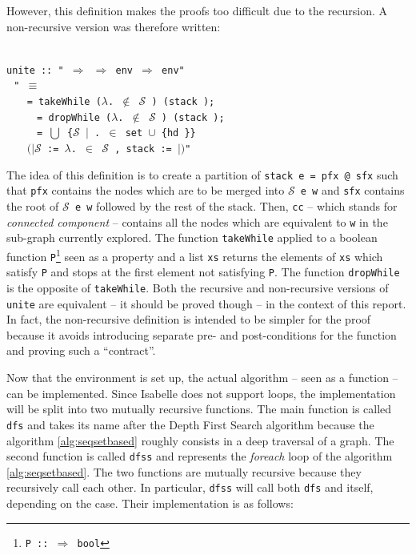 \documentclass[a4 paper, 12pt]{article}
\newcommand{\where}{{\color{isa_green}{where}}}
\newcommand{\generic}[1]{{\color{isa_purple}{\textquotesingle#1}}}
\newcommand{\isa}[1]{\small\texttt{\\\noindent#1}}
\newcommand{\blue}[1]{{\color{isa_dark_blue}{#1}}}
\newcommand{\bblue}[1]{{\color{isa_blue}{#1}}}
\newcommand{\green}[1]{{\color{isa_dark_green}{#1}}}
\newcommand{\env}[1]{$(\!|$#1$|\!)$}
\theoremstyle{definition}
\begin{document}
\BlankLine

However, this definition makes the proofs too difficult due to the recursion. A non-recursive version was therefore written:

\isa{
    \bblue{definition} unite :: "\generic{v} $\Rightarrow$ \generic{v} $\Rightarrow$ \generic{v} env $\Rightarrow$ \generic{v} env" \where{}\\
    $~~~$"\blue{unite} \green{v w e} $\equiv$\\
    $~~~~~~$\bblue{let} \green{pfx} = takeWhile ($\lambda$\green{x}. \green{w} $\notin$ $\mathcal{S}$ \green{e x}) (stack \green{e});\\
    $~~~~~~~~~~$\green{sfx} = dropWhile ($\lambda$\green{x}. \green{w} $\notin$ $\mathcal{S}$ \green{e x}) (stack \green{e});\\
    $~~~~~~~~~~$\green{cc} = $\bigcup$ \{$\mathcal{S}$ \green{e x} $|$ \green{x}. \green{x} $\in$ set \green{pfx} $\cup$ \{hd \green{sfx}\}\}\\
    $~~~~~~$\bblue{in}  \green{e}\env{$\mathcal{S}$ := $\lambda$\green{x}. \bblue{if} \green{x} $\in$ \green{cc} \bblue{then} \green{cc} \bblue{else} $\mathcal{S}$ \green{e x}, stack := \green{sfx}}"
}
    
\BlankLine
\BlankLine
\BlankLine

The idea of this definition is to create a partition of \texttt{stack e = pfx @ sfx} such that \texttt{pfx} contains the nodes which are to be merged into \texttt{$\mathcal{S}$ e w} and \texttt{sfx} contains the root of \texttt{$\mathcal{S}$ e w} followed by the rest of the stack. Then, \texttt{cc} -- which stands for \textit{connected component} -- contains all the nodes which are equivalent to \texttt{w} in the sub-graph currently explored. The function \texttt{takeWhile} applied to a boolean function \texttt{P}\footnote{\texttt{P :: \generic{a} $\Rightarrow$ bool}} seen as a property and a list \texttt{xs} returns the elements of \texttt{xs} which satisfy \texttt{P} and stops at the first element not satisfying \texttt{P}. The function \texttt{dropWhile} is the opposite of \texttt{takeWhile}. Both the recursive and non-recursive versions of \texttt{unite} are equivalent -- it should be proved though -- in the context of this report. In fact, the non-recursive definition is intended to be simpler for the proof because it avoids introducing separate pre- and post-conditions for the function and proving such a ``contract''.

\BlankLine

Now that the environment is set up, the actual algorithm -- seen as a function -- can be implemented.
Since Isabelle does not support loops, the implementation will be split into two mutually recursive functions. The main function is called \texttt{dfs} and takes its name after the Depth First Search algorithm because the algorithm \ref{alg:seqsetbased} roughly consists in a deep traversal of a graph. The second function is called \texttt{dfss} and represents the \textit{foreach} loop of the algorithm \ref{alg:seqsetbased}. The two functions are mutually recursive because they recursively call each other. In particular, \texttt{dfss} will call both \texttt{dfs} and itself, depending on the case. Their implementation is as follows:
\end{document}
